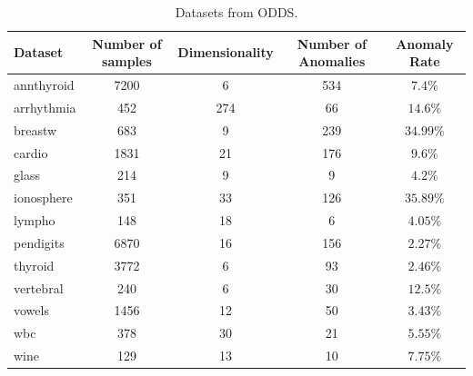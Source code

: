 \documentclass[11pt,onecolumn]{article}
\begin{document}
\begin{table}[h!]
	\centering
	\begin{tabular}{lcccc}
	\toprule
	\textbf{Dataset} & \textbf{Number of samples} & \textbf{Dimensionality} & \textbf{Number of Anomalies} & \textbf{Anomaly Rate}	\\
	\midrule
	annthyroid & 7200 & 6 & 534 & $7.4	\%$\\
	arrhythmia & 452 & 274 & 66 & $14.6\%$\\
	breastw & 683 & 9 & 239 & $34.99\%$\\
	cardio & 1831 & 21 & 176 & $9.6\%$\\
	glass & 214 & 9 & 9 & $4.2\%$\\
	ionosphere & 351 & 33 & 126 & $35.89\%$\\
	lympho & 148 & 18 & 6 & $4.05\%$\\
	pendigits & 6870 & 16 & 156 & $2.27\%$\\
	thyroid & 3772 & 6 & 93 & $2.46\%$\\
	vertebral & 240 & 6 & 30 & $12.5\%$\\
	{vowels} & 1456 & 12 & 50 & $3.43\%$\\
	wbc & 378 & 30 & 21 & $5.55\%$\\
	wine & 129 & 13 & 10 & $7.75\%$\\
	\bottomrule
	\end{tabular}
	\caption{Datasets from ODDS.}
	\label{table:datasets}
\end{table}
\end{document}
